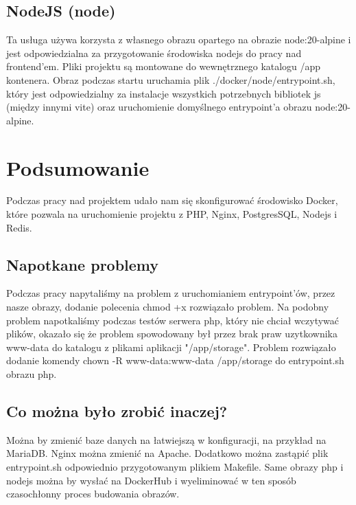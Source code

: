 \documentclass{article}
\begin{document}
\subsection{NodeJS (node)}
Ta usługa używa korzysta z własnego obrazu opartego na obrazie node:20-alpine i jest odpowiedzialna za przygotowanie środowiska nodejs do pracy nad frontend'em. Pliki projektu są montowane do wewnętrznego katalogu /app kontenera. Obraz podczas startu uruchamia plik ./docker/node/entrypoint.sh, który jest odpowiedzialny za instalacje wszystkich potrzebnych bibliotek js (między innymi vite) oraz uruchomienie domyślnego entrypoint'a obrazu node:20-alpine.

\section{Podsumowanie}
Podczas pracy nad projektem udało nam się skonfigurować środowisko Docker, które pozwala na uruchomienie projektu z PHP, Nginx, PostgresSQL, Nodejs i Redis. 

\subsection{Napotkane problemy}
Podczas pracy napytaliśmy na problem z uruchomianiem entrypoint'ów, przez nasze obrazy, dodanie polecenia chmod +x rozwiązało problem. Na podobny problem napotkaliśmy podczas testów serwera php, który nie chciał wczytywać plików, okazało się że problem spowodowany był przez brak praw uzytkownika www-data do katalogu z plikami aplikacji "/app/storage". Problem rozwiązało dodanie komendy chown -R www-data:www-data /app/storage
do entrypoint.sh obrazu php.

\subsection{Co można było zrobić inaczej?}
Można by zmienić baze danych na łatwiejszą w konfiguracji, na przykład na MariaDB. Nginx można zmienić na Apache. Dodatkowo można zastąpić plik entrypoint.sh odpowiednio przygotowanym plikiem Makefile. Same obrazy php i nodejs można by wysłać na DockerHub i wyeliminować w ten sposób czasochłonny proces budowania obrazów.
\end{document}
